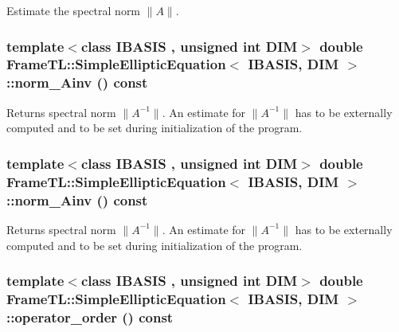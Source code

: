 Estimate the spectral norm $\|A\|$. \hypertarget{classFrameTL_1_1SimpleEllipticEquation_4c74106d2957712ae44948082f2a92d5}{
\subsubsection[{norm\_\-Ainv}]{\setlength{\rightskip}{0pt plus 5cm}template$<$class IBASIS , unsigned int DIM$>$ double {\bf FrameTL::SimpleEllipticEquation}$<$ IBASIS, DIM $>$::norm\_\-Ainv () const}}
\label{classFrameTL_1_1SimpleEllipticEquation_4c74106d2957712ae44948082f2a92d5}


Returns spectral norm $\|A^{-1}\|$. An estimate for $\|A^{-1}\|$ has to be externally computed and to be set during initialization of the program. \hypertarget{classFrameTL_1_1SimpleEllipticEquation_4c74106d2957712ae44948082f2a92d5}{
\subsubsection[{norm\_\-Ainv}]{\setlength{\rightskip}{0pt plus 5cm}template$<$class IBASIS , unsigned int DIM$>$ double {\bf FrameTL::SimpleEllipticEquation}$<$ IBASIS, DIM $>$::norm\_\-Ainv () const}}
\label{classFrameTL_1_1SimpleEllipticEquation_4c74106d2957712ae44948082f2a92d5}


Returns spectral norm $\|A^{-1}\|$. An estimate for $\|A^{-1}\|$ has to be externally computed and to be set during initialization of the program. \hypertarget{classFrameTL_1_1SimpleEllipticEquation_b630525bc26c31fd7fd241c2d31fd4c8}{
\subsubsection[{operator\_\-order}]{\setlength{\rightskip}{0pt plus 5cm}template$<$class IBASIS , unsigned int DIM$>$ double {\bf FrameTL::SimpleEllipticEquation}$<$ IBASIS, DIM $>$::operator\_\-order () const}}
\label{classFrameTL_1_1SimpleEllipticEquation_b630525bc26c31fd7fd241c2d31fd4c8}


